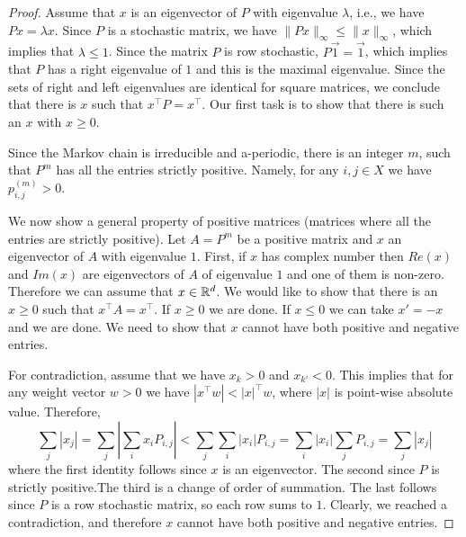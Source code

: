 \begin{proof}
Assume that $x$ is an eigenvector of $P$ with eigenvalue $\lambda$,
i.e., we have $Px=\lambda x$. Since $P$ is a stochastic matrix, we
have $\|P x\|_\infty \leq \|x\|_\infty$, which implies that $\lambda
\leq 1$. Since the matrix $P$ is row stochastic, $P\vec{1}=\vec{1}$,
which implies that $P$ has a right eigenvalue of $1$ and this is the
maximal eigenvalue. Since the sets of right and left eigenvalues are
identical for square matrices, we conclude that there is $x$ such that $x^\top P=x^\top$.
Our first task is to show that there is such an $x$ with $x\geq0$.

Since the Markov chain is irreducible and a-periodic, there is an
integer $m$, such that $P^m$ has all the entries strictly positive.
Namely, for any $i,j\in X$ we have $p^{(m)}_{i,j}>0$.

We now show a general property of positive matrices (matrices where
all the entries are strictly positive). Let $A=P^m$ be a positive
matrix and $x$ an eigenvector of $A$ with eigenvalue $1$. First, if
$x$ has complex number then $Re(x)$ and $Im(x)$ are eigenvectors
of $A$ of eigenvalue $1$ and one of them is non-zero. Therefore we
can assume that $x\in \mathbb{R}^d$. We would like to show that there is
an $x\geq 0$ such that $x^\top A=x^\top$. If $x\geq 0$ we are done.
If $x\leq 0$ we can take $x'=-x$ and we are done. We need to show
that $x$ cannot have both positive and negative entries.

For contradiction, assume that we have $x_{k}>0$ and $x_{k'}<0$.
This implies that for any weight vector $w>0$ we have $|x^\top w| <
|x|^\top w$, where $|x|$ is point-wise absolute value. Therefore,
\[
\sum_j |x_j|= \sum_j |\sum_i x_i P_{i,j}| < \sum_j \sum_i |x_i|
P_{i,j}=  \sum_i |x_i| \sum_j P_{i,j}= \sum_j |x_j|
\]
where the first identity follows since $x$ is an eigenvector. The
second since $P$ is strictly positive.The third is a change of order
of summation. The last follows since $P$ is a row stochastic matrix, so
each row sums to $1$. Clearly, we reached a contradiction, and
therefore $x$ cannot have both positive and negative entries.

%
%


\end{proof}
